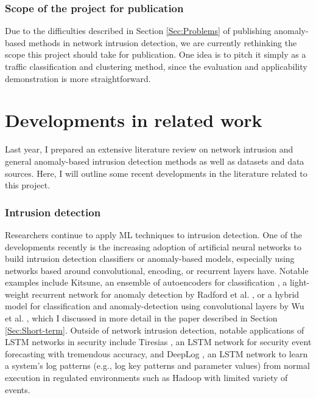 \documentclass[a4paper,12pt,twoside]{article}
\begin{document}
\subsubsection{Scope of the project for publication}

Due to the difficulties described in Section \ref{Sec:Problems} of publishing anomaly-based methods in network intrusion detection, we are currently rethinking the scope this project should take for publication. One idea is to pitch it simply as a traffic classification and clustering method, since the evaluation and applicability demonstration is more straightforward.



\section{Developments in related work}

Last year, I prepared an extensive literature review on network intrusion and general anomaly-based intrusion detection methods as well as datasets and data sources. Here, I will outline some recent developments in the literature related to this project.

\subsubsection{Intrusion detection}


Researchers continue to apply ML techniques to intrusion detection. One of the developments recently is the increasing adoption of artificial neural networks to build intrusion detection classifiers or anomaly-based models, especially using networks based around convolutional, encoding, or recurrent layers have.
Notable examples include Kitsune, an ensemble of autoencoders for classification \cite{mirsky2018kitsune}, a light-weight recurrent network for anomaly detection by Radford et al. \cite{radford2018network}, or a hybrid model for classification and anomaly-detection using convolutional layers by Wu et al. \cite{wu2018novel}, which I discussed in more detail in the paper described in Section \ref{Sec:Short-term}.
Outside of network intrusion detection, notable applications of LSTM networks in security include Tiresias \cite{shen2018tiresias}, an LSTM network for security event forecasting with tremendous accuracy, and DeepLog \cite{du2017deeplog}, an LSTM network to learn a system's log patterns (e.g., log key patterns and parameter values) from normal execution in regulated environments such as Hadoop with limited variety of events.
\end{document}
